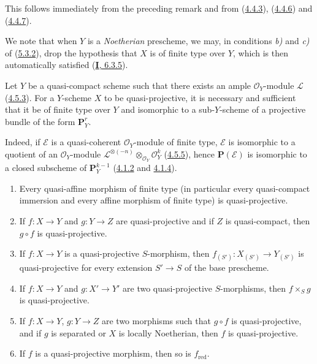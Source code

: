 This follows immediately from the preceding remark and from
(\hyperref[II.4.4.3]{4.4.3}), (\hyperref[II.4.4.6]{4.4.6}) and
(\hyperref[II.4.4.7]{4.4.7}).

We note that when $Y$ is a \emph{Noetherian} prescheme, we may, in
conditions \emph{b)} and \emph{c)} of (\hyperref[II.5.3.2]{5.3.2}), drop the
hypothesis that $X$ is of finite type over $Y$, which is then automatically
satisfied (\hyperref[I.6.3.5]{\textbf{I}, 6.3.5}).

\begin{corollary}[5.3.3]
\label{II.5.3.3}
Let $Y$ be a quasi-compact scheme such that there exists an ample
$\mathcal{O}_Y$-module $\mathcal{L}$ \textup{(\hyperref[II.4.5.3]{4.5.3})}. For a
$Y$-scheme $X$ to be quasi-projective, it is necessary and sufficient that it
be of finite type over $Y$ and isomorphic to a sub-$Y$-scheme of a projective
bundle of the form $\mathbf{P}_Y^r$.
\end{corollary}

Indeed, if $\mathcal{E}$ is a quasi-coherent $\mathcal{O}_Y$-module of
finite type, $\mathcal{E}$ is isomorphic to a quotient of an
$\mathcal{O}_Y$-module
$\mathcal{L}^{\otimes(-n)}\otimes_{\mathcal{O}_Y}\mathcal{O}_Y^k$
(\hyperref[II.4.5.5]{4.5.5}), hence $\mathbf{P}(\mathcal{E})$ is
isomorphic to a closed subscheme of $\mathbf{P}_Y^{k-1}$
(\hyperref[II.4.1.2]{4.1.2} and \hyperref[II.4.1.4]{4.1.4}).

\begin{proposition}[5.3.4]
\label{II.5.3.4}
\begin{enumerate}
  \item[\rm{(i)}] Every quasi-affine morphism of finite type (in particular every
  quasi-compact immersion and every affine morphism of finite type) is
  quasi-projective.
  \item[\rm{(ii)}] If $f:X\to Y$ and $g:Y\to Z$ are quasi-projective and if
  $Z$ is quasi-compact, then $g\circ f$ is quasi-projective.


  \item[\rm{(iii)}] If $f:X\to Y$ is a quasi-projective $S$-morphism, then
  $f_{(S')}:X_{(S')}\to Y_{(S')}$ is quasi-projective for every extension
  $S'\to S$ of the base prescheme.
  \item[\rm{(iv)}] If $f:X\to Y$ and $g:X'\to Y'$ are two quasi-projective
  $S$-morphisms, then $f\times_Sg$ is quasi-projective.
  \item[\rm{(v)}] If $f:X\to Y$, $g:Y\to Z$ are two morphisms such that
  $g\circ f$ is quasi-projective, and if $g$ is separated or $X$ is locally
  Noetherian, then $f$ is quasi-projective.
  \item[\rm{(vi)}] If $f$ is a quasi-projective morphism, then so is
  $f_{\mathrm{red}}$.
\end{enumerate}
\end{proposition}

